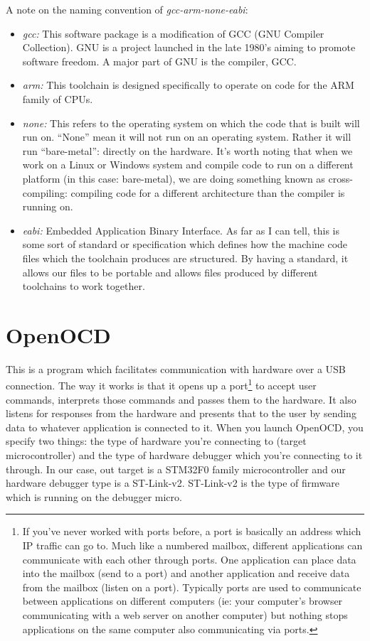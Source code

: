 A note on the naming convention of \emph{gcc-arm-none-eabi}:
\begin{itemize}
\item \emph{gcc:} This software package is a modification of GCC (GNU Compiler Collection). GNU is a project launched in the late 1980's aiming to promote software freedom. A major part of GNU is the compiler, GCC. 
\item \emph{arm:} This toolchain is designed specifically to operate on code for the ARM family of CPUs.
\item \emph{none:} This refers to the operating system on which the code that is built will run on. ``None'' mean it will not run on an operating system. Rather it will run ``bare-metal'': directly on the hardware. It's worth noting that when we work on a Linux or Windows system and compile code to run on a different platform (in this case: bare-metal), we are doing something known as cross-compiling: compiling code for a different architecture than the compiler is running on.
\item \emph{eabi:} Embedded Application Binary Interface. As far as I can tell, this is some sort of standard or specification which defines how the machine code files which the toolchain produces are structured. By having a standard, it allows our files to be portable and allows files produced by different toolchains to work together.
\end{itemize}

\section{OpenOCD}
This is a program which facilitates communication with hardware over a USB connection. The way it works is that it opens up a port\footnote{If you've never worked with ports before, a port is basically an address which IP traffic can go to. Much like a numbered mailbox, different applications can communicate with each other through ports. One application can place data into the mailbox (send to a port) and another application and receive data from the mailbox (listen on a port). Typically ports are used to communicate between applications on different computers (ie: your computer's browser communicating with a web server on another computer) but nothing stops applications on the same computer also communicating via ports.}
to accept user commands, interprets those commands and passes them to the hardware. It also listens for responses from the hardware and presents that to the user by sending data to whatever application is connected to it. When you launch OpenOCD, you specify two things: the type of hardware you're connecting to (target microcontroller) and the type of hardware debugger which you're connecting to it through. In our case, out target is a STM32F0 family microcontroller and our hardware debugger type is a ST-Link-v2. ST-Link-v2 is the type of firmware which is running on the debugger micro.

